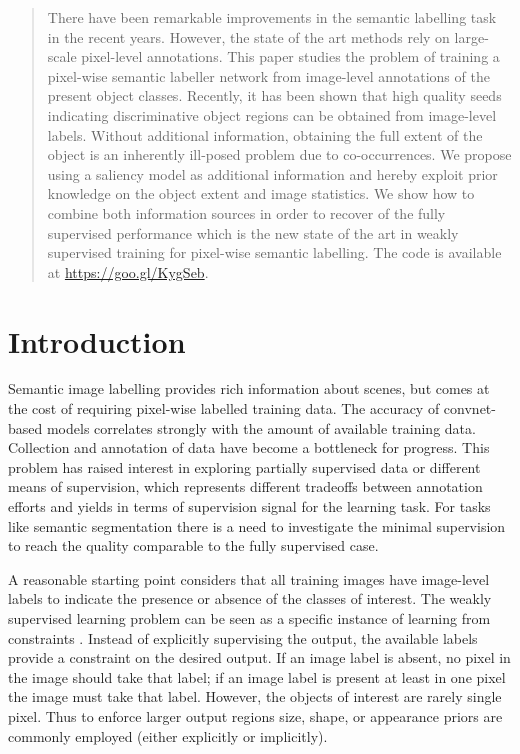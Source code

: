 \documentclass[british,10pt,twocolumn,letterpaper]{article}
\begin{document}
\begin{abstract}
There have been remarkable improvements in the semantic labelling
task in the recent years. However, the state of the art methods rely
on large-scale pixel-level annotations. This paper studies the problem
of training a pixel-wise semantic labeller network from image-level
annotations of the present object classes. Recently, it has been shown
that high quality seeds indicating discriminative object regions can
be obtained from image-level labels. Without additional information,
obtaining the full extent of the object is an inherently ill-posed
problem due to co-occurrences. We propose using a saliency model as
additional information and hereby exploit prior knowledge on the
object extent and image statistics. We show how to combine both information
sources in order to recover  of the fully supervised performance
\textendash{} which is the new state of the art in weakly supervised
training for pixel-wise semantic labelling. The code is available at \url{https://goo.gl/KygSeb}.


\end{abstract}

\section{\label{sec:Introduction}Introduction}


\noindent Semantic image labelling provides rich information about
scenes, but comes at the cost of requiring pixel-wise labelled training
data. The accuracy of convnet-based models correlates strongly with
the amount of available training data. Collection and annotation of
data have become a bottleneck for progress. This problem has raised
interest in exploring partially supervised data or different means
of supervision, which represents different tradeoffs between annotation
efforts and yields in terms of supervision signal for the learning
task. For tasks like semantic segmentation there is a need to investigate
the minimal supervision to reach the quality comparable to the fully
supervised case.

A reasonable starting point considers that all training images have
image-level labels to indicate the presence or absence of the classes
of interest. The weakly supervised learning problem can be seen as
a specific instance of learning from constraints \cite{Shcherbatyi2016Gcpr,Xu2015CvprWeakSegmentation}.
Instead of explicitly supervising the output, the available labels
provide a constraint on the desired output. If an image label is absent,
no pixel in the image should take that label; if an image label is
present at least in one pixel the image must take that label. However,
the objects of interest are rarely single pixel. Thus to enforce larger
output regions size, shape, or appearance priors are commonly employed
(either explicitly or implicitly). 
\end{document}
